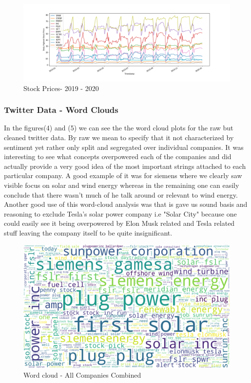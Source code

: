\documentclass[sigconf, nonacm]{acmart}
\begin{document}
\begin{figure}[H]
  \centering
  \includegraphics[width=\linewidth]{images/stock_prices_all_2019t20.png}
  \caption{Stock Prices- 2019 - 2020}
\end{figure}




\subsubsection{Twitter Data - Word Clouds}
In the figures(4) and (5) we can see the the word cloud plots for the raw but cleaned twitter data. By raw we mean to specify that it not characterized by sentiment yet rather only split and segregated over individual companies. It was interesting to see what concepts overpowered each of the companies and did actually provide a very good idea of the most important strings attached to each particular company. A good example of it was for siemens where we clearly saw visible focus on solar and wind energy whereas in the remaining one can easily conclude that there wasn't much of he talk around or relevant to wind energy. Another good use of this word-cloud analysis was that is gave us sound basis and reasoning to exclude Tesla's solar power company i.e "Solar City" because one could easily see it being overpowered by Elon Musk related and Tesla related stuff leaving the company itself to be quite insignificant. 
\begin{figure}[H]
  \centering
  \includegraphics[width=1\linewidth]{images/complete_wordcloud2.png}
  \caption{Word cloud - All Companies Combined}
\end{figure}
\end{document}
